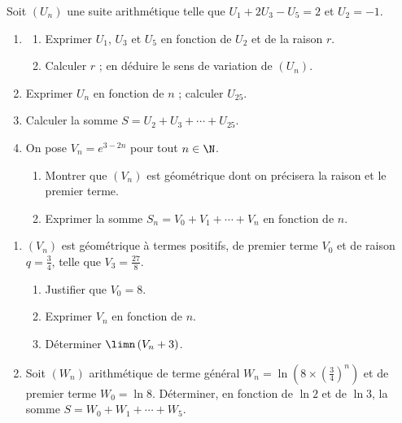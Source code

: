 \begin{annales}
Soit $\left(U_{n}\right)$ une suite arithmétique telle que
$U_{1}+2U_{3}-U_{5} = 2$ et $U_{2} = -1$.
\begin{enumerate}[label=\textbf{\arabic*)}, leftmargin=*, itemsep=0.15em]
  \item \begin{enumerate}[label=\textbf{\alph*)}, leftmargin=1.4em]
          \item Exprimer $U_{1}$, $U_{3}$ et $U_{5}$ en fonction de $U_{2}$
                et de la raison $r$.
          \item Calculer $r$ ; en déduire le sens de variation de
                $\left(U_{n}\right)$.
        \end{enumerate}
  \item Exprimer $U_{n}$ en fonction de $n$ ; calculer $U_{25}$.
  \item Calculer la somme $S = U_{2}+U_{3}+\cdots+U_{25}$.
  \item On pose $V_{n} = e^{3-2n}$ pour tout $n \in \N$.
        \begin{enumerate}[label=\textbf{\alph*)}, leftmargin=1.4em]
          \item Montrer que $\left(V_{n}\right)$ est géométrique dont on
                précisera la raison et le premier terme.
          \item Exprimer la somme $S_{n} = V_{0}+V_{1}+\cdots+V_{n}$ en
                fonction de $n$.
        \end{enumerate}
\end{enumerate}

\begin{enumerate}[label=\textbf{\arabic*)}, leftmargin=*, itemsep=0.15em]
  \item $\left(V_{n}\right)$ est géométrique à termes positifs, de premier
        terme $V_{0}$ et de raison $q = \frac34$, telle que
        $V_{3} = \frac{27}{8}$.
        \begin{enumerate}[label=\textbf{\alph*)}, leftmargin=1.4em]
          \item Justifier que $V_{0} = 8$.
          \item Exprimer $V_{n}$ en fonction de $n$.
          \item Déterminer $\limn \left(V_{n}+3\right)$.
        \end{enumerate}
  \item Soit $\left(W_{n}\right)$ arithmétique de terme général
        $W_{n} = \ln\left(8\times\left(\frac34\right)^{n}\right)$ et de
        premier terme $W_{0} = \ln 8$. Déterminer, en fonction de $\ln 2$ et
        de $\ln 3$, la somme $S = W_{0}+W_{1}+\cdots+W_{5}$.
\end{enumerate}
\end{annales}

